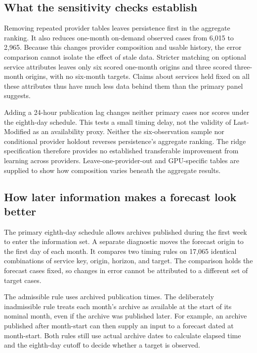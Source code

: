 \documentclass[10pt]{article}
\begin{document}
\subsection{What the sensitivity checks establish}

Removing repeated provider tables leaves persistence first in the aggregate ranking. It also reduces one-month on-demand observed cases from 6,015 to 2,965. Because this changes provider composition and usable history, the error comparison cannot isolate the effect of stale data. Stricter matching on optional service attributes leaves only six scored one-month origins and three scored three-month origins, with no six-month targets. Claims about services held fixed on all these attributes thus have much less data behind them than the primary panel suggests.

\begin{table}[H]
\centering\small

\caption{Selected one-month sensitivity results. These checks use different samples, except provider holdout, which changes only ridge training. Results for all horizons and methods accompany the study.}
\label{tab:table3}
\end{table}

Adding a 24-hour publication lag changes neither primary cases nor scores under the eighth-day schedule. This tests a small timing delay, not the validity of Last-Modified as an availability proxy. Neither the six-observation sample nor conditional provider holdout reverses persistence's aggregate ranking. The ridge specification therefore provides no established transferable improvement from learning across providers. Leave-one-provider-out and GPU-specific tables are supplied to show how composition varies beneath the aggregate results.

\subsection{How later information makes a forecast look better}

The primary eighth-day schedule allows archives published during the first week to enter the information set. A separate diagnostic moves the forecast origin to the first day of each month. It compares two timing rules on 17,065 identical combinations of service key, origin, horizon, and target. The comparison holds the forecast cases fixed, so changes in error cannot be attributed to a different set of target cases.

The admissible rule uses archived publication times. The deliberately inadmissible rule treats each month's archive as available at the start of its nominal month, even if the archive was published later. For example, an archive published after month-start can then supply an input to a forecast dated at month-start. Both rules still use actual archive dates to calculate elapsed time and the eighth-day cutoff to decide whether a target is observed.
\end{document}
